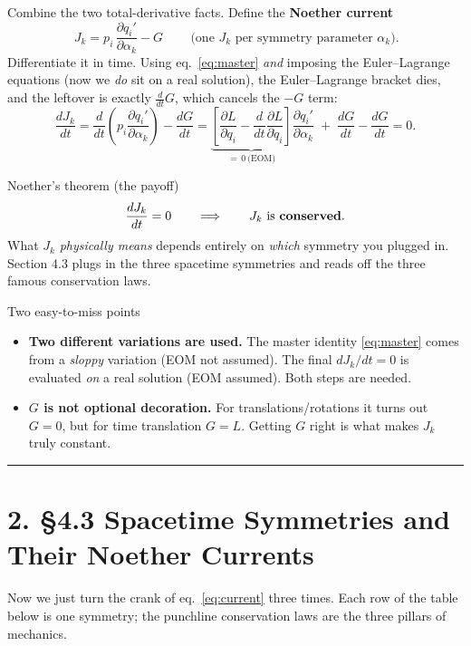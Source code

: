 \documentclass[11pt]{article}
\newcommand{\dd}[2]{\frac{\partial #1}{\partial #2}}
\newcommand{\ddt}[1]{\frac{d#1}{dt}}
\begin{document}
Combine the two total-derivative facts. Define the \textbf{Noether current}
\begin{equation}
\boxed{\,J_k = p_i\,\dd{q_i'}{\alpha_k} - G\,}\qquad\text{(one $J_k$ per symmetry parameter $\alpha_k$).}
\label{eq:current}
\end{equation}
Differentiate it in time. Using eq.~\eqref{eq:master} \emph{and} imposing the
Euler--Lagrange equations (now we \emph{do} sit on a real solution), the
Euler--Lagrange bracket dies, and the leftover is exactly $\frac{d}{dt}G$, which
cancels the $-G$ term:
\begin{equation}
\ddt{J_k}
= \ddt{}\!\left(p_i\dd{q_i'}{\alpha_k}\right)-\ddt{G}
= \underbrace{\left[\dd{L}{q_i}-\ddt{}\dd{L}{\dot q_i}\right]}_{=\,0\ \text{(EOM)}}\dd{q_i'}{\alpha_k}
\;+\;\ddt{G}-\ddt{G}
= 0 .
\end{equation}

\begin{keybox}{Noether's theorem (the payoff)}
\[
\ddt{J_k}=0 \qquad\Longrightarrow\qquad J_k \text{ is \textbf{conserved}.}
\]
What $J_k$ \emph{physically means} depends entirely on \emph{which} symmetry you
plugged in. Section 4.3 plugs in the three spacetime symmetries and reads off
the three famous conservation laws.
\end{keybox}

\begin{watchbox}{Two easy-to-miss points}
\begin{itemize}[nosep]
  \item \textbf{Two different variations are used.} The master identity
  \eqref{eq:master} comes from a \emph{sloppy} variation (EOM not assumed). The
  final $dJ_k/dt=0$ is evaluated \emph{on} a real solution (EOM assumed). Both
  steps are needed.
  \item \textbf{$G$ is not optional decoration.} For translations/rotations it
  turns out $G=0$, but for time translation $G=L$. Getting $G$ right is what
  makes $J_k$ truly constant.
\end{itemize}
\end{watchbox}

\bigskip
\hrule
\bigskip

\section*{2. \S4.3 Spacetime Symmetries and Their Noether Currents}

Now we just turn the crank of eq.~\eqref{eq:current} three times. Each row of
the table below is one symmetry; the punchline conservation laws are the three
pillars of mechanics.
\end{document}
